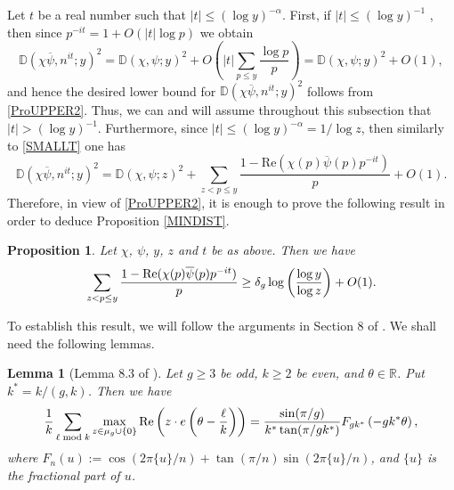 \documentclass[12pt]{amsart}
\newtheorem{lem}[thm]{Lemma}
\newtheorem{pro}[thm]{Proposition}
\theoremstyle{definition}
\numberwithin{equation}{section}
\newcommand{\mb}{\mathbb}
\renewcommand{\bar}{\overline}
\begin{document}
Let $t$ be a real number such that $|t|\leq (\log y)^{-\alpha}$. First, if $|t|\leq (\log y)^{-1}$ , then since $p^{-it}=1+O(|t|\log p)$ we obtain
\begin{equation}\label{SMALLT}
\mb{D}(\chi\bar{\psi}, n^{it}; y)^2= \mb{D}(\chi, \psi; y)^2+O\left(|t| \sum_{p \leq y} \frac{\log p}{p}\right)=\mb{D}(\chi, \psi; y)^2+O(1),
\end{equation}
and hence the desired lower bound for $\mb{D}(\chi\bar{\psi}, n^{it}; y)^2$ follows from \eqref{ProUPPER2}. Thus, we can and will assume throughout this subsection that $|t|> (\log y)^{-1}$. 
Furthermore, since $|t| \leq (\log y)^{-\alpha}=1/\log z$, then similarly to \eqref{SMALLT} one has
 $$
\mb{D}(\chi\bar{\psi}, n^{it}; y)^2
=\mb{D}(\chi, \psi; z)^2+
\sum_{z < p \leq y} \frac{1-\text{Re}(\chi(p)\bar{\psi}(p)p^{-it})}{p} +O(1).
$$
Therefore, in view of  \eqref{ProUPPER2}, it is enough to prove the following result in order to deduce  Proposition \ref{MINDIST}.
\begin{pro}\label{MEDIUMPRIMES} Let $\chi$, $\psi$, $y$, $z$ and $t$ be as above. Then we have
 $$\sum_{z < p \leq y} \frac{1-\textup{Re}(\chi(p)\bar{\psi}(p)p^{-it})}{p}\geq \delta_g \log\left(\frac{\log y}{\log z}\right)+O(1).$$
\end{pro}
To establish this result, we will follow the arguments in Section 8 of \cite{GOLD}. We shall need the following lemmas.
\begin{lem}[Lemma 8.3 of \cite{GOLD}]\label{MAXGold}
Let $g\geq 3$ be odd, $k\geq 2$ be even, and $\theta\in \mathbb{R}$. Put $k^{\ast}=k/(g, k)$. Then we have
$$
\frac{1}{k}\sum_{\ell \bmod k} \max_{z\in \mu_g\cup \{0\}}\textup{Re}\left(z \cdot e\left(\theta - \frac{\ell}{k}\right)\right) = \frac{\sin(\pi/g)}{ k^{\ast}\tan(\pi/gk^{\ast})} F_{gk^{\ast}}\left(-gk^{\ast} \theta\right),
$$
where $F_n(u) := \cos(2\pi\{u\}/n) + \tan(\pi/n)\sin(2\pi \{u\}/n)$, and $\{u\}$ is the fractional part of $u$.
\end{lem}
\end{document}
